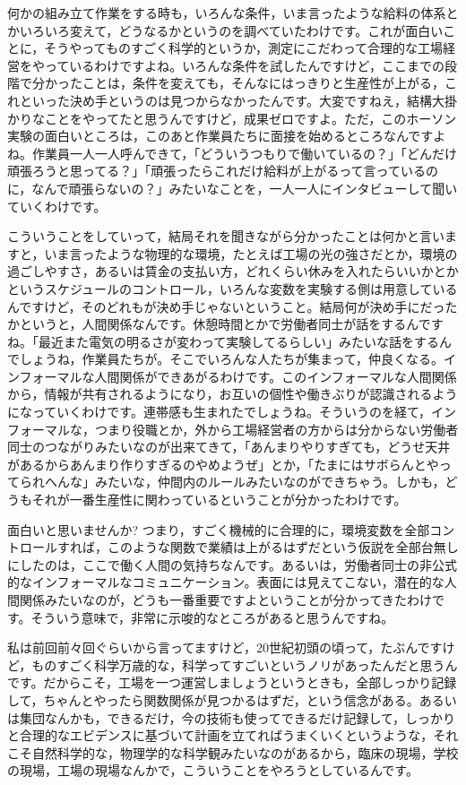 \documentclass{ltjsbook}
\begin{document}
何かの組み立て作業をする時も，いろんな条件，いま言ったような給料の体系とかいろいろ変えて，どうなるかというのを調べていたわけです。これが面白いことに，そうやってものすごく科学的というか，測定にこだわって合理的な工場経営をやっているわけですよね。いろんな条件を試したんですけど，ここまでの段階で分かったことは，条件を変えても，そんなにはっきりと生産性が上がる，これといった決め手というのは見つからなかったんです。大変ですねえ，結構大掛かりなことをやってたと思うんですけど，成果ゼロですよ。ただ，このホーソン実験の面白いところは，このあと作業員たちに面接を始めるところなんですよね。作業員一人一人呼んできて，「どういうつもりで働いているの？」「どんだけ頑張ろうと思ってる？」「頑張ったらこれだけ給料が上がるって言っているのに，なんで頑張らないの？」みたいなことを，一人一人にインタビューして聞いていくわけです。

こういうことをしていって，結局それを聞きながら分かったことは何かと言いますと，いま言ったような物理的な環境，たとえば工場の光の強さだとか，環境の過ごしやすさ，あるいは賃金の支払い方，どれくらい休みを入れたらいいかとかというスケジュールのコントロール，いろんな変数を実験する側は用意しているんですけど，そのどれもが決め手じゃないということ。結局何が決め手にだったかというと，人間関係なんです。休憩時間とかで労働者同士が話をするんですね。「最近また電気の明るさが変わって実験してるらしい」みたいな話をするんでしょうね，作業員たちが。そこでいろんな人たちが集まって，仲良くなる。インフォーマルな人間関係ができあがるわけです。このインフォーマルな人間関係から，情報が共有されるようになり，お互いの個性や働きぶりが認識されるようになっていくわけです。連帯感も生まれたでしょうね。そういうのを経て，インフォーマルな，つまり役職とか，外から工場経営者の方からは分からない労働者同士のつながりみたいなのが出来てきて，「あんまりやりすぎても，どうせ天井があるからあんまり作りすぎるのやめようぜ」とか，「たまにはサボらんとやってられへんな」みたいな，仲間内のルールみたいなのができちゃう。しかも，どうもそれが一番生産性に関わっているということが分かったわけです。

面白いと思いませんか? つまり，すごく機械的に合理的に，環境変数を全部コントロールすれば，このような関数で業績は上がるはずだという仮説を全部台無しにしたのは，ここで働く人間の気持ちなんです。あるいは，労働者同士の非公式的なインフォーマルなコミュニケーション。表面には見えてこない，潜在的な人間関係みたいなのが，どうも一番重要ですよということが分かってきたわけです。そういう意味で，非常に示唆的なところがあると思うんですね。

私は前回前々回ぐらいから言ってますけど，20世紀初頭の頃って，たぶんですけど，ものすごく科学万歳的な，科学ってすごいというノリがあったんだと思うんです。だからこそ，工場を一つ運営しましょうというときも，全部しっかり記録して，ちゃんとやったら関数関係が見つかるはずだ，という信念がある。あるいは集団なんかも，できるだけ，今の技術も使ってできるだけ記録して，しっかりと合理的なエビデンスに基づいて計画を立てればうまくいくというような，それこそ自然科学的な，物理学的な科学観みたいなのがあるから，臨床の現場，学校の現場，工場の現場なんかで，こういうことをやろうとしているんです。
\end{document}

